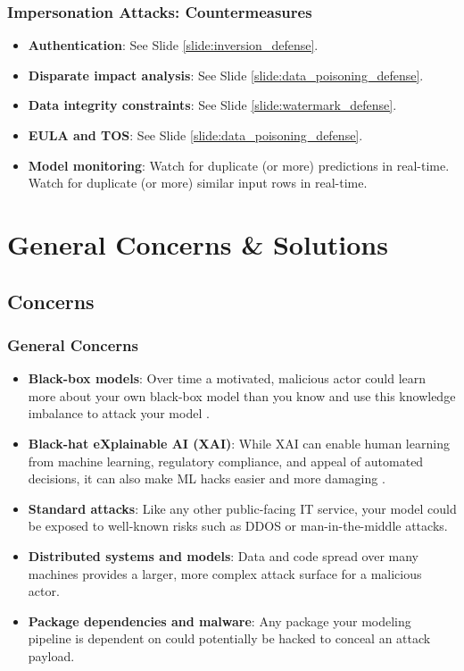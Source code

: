 \documentclass[11pt,
               aspectratio=169,
               hyperref={colorlinks}
               ]{beamer}
\begin{document}
			\begin{frame}
		
				\frametitle{Impersonation Attacks: \textbf{Countermeasures}}		
			
				\begin{itemize}
					\Large
					\item \textbf{Authentication}: See Slide \ref{slide:inversion_defense}. 
					\item \textbf{Disparate impact analysis}: See Slide \ref{slide:data_poisoning_defense}.
					\item \textbf{Data integrity constraints}: See Slide \ref{slide:watermark_defense}.
					\item \textbf{EULA and TOS}: See Slide \ref{slide:data_poisoning_defense}.
					\item \textbf{Model monitoring}: Watch for duplicate (or more) predictions in real-time. Watch for duplicate (or more) similar input rows in real-time.
				\end{itemize}
				
			\end{frame}

	\section{General Concerns \& Solutions}

		\subsection{Concerns}
			\begin{frame}[t, allowframebreaks]	
		
				\frametitle{General Concerns}	
				\footnotesize
				\begin{itemize}
					\item \textbf{Black-box models}: Over time a motivated, malicious actor could learn more about your own black-box model than you know and use this knowledge imbalance to attack your model \cite{papernot2018marauder}.
					\item \textbf{Black-hat eXplainable AI (XAI)}:  While XAI can enable human learning from machine learning, regulatory compliance, and appeal of automated decisions, it can also make ML hacks easier and more damaging \cite{shokri2019privacy}.
					\item \textbf{Standard attacks}: Like any other public-facing IT service, your model could be exposed to well-known risks such as DDOS or man-in-the-middle attacks.  
					\item \textbf{Distributed systems and models}: Data and code spread over many machines provides a larger, more complex attack surface for a malicious actor.
					\item \textbf{Package dependencies and malware}: Any package your modeling pipeline is dependent on could potentially be hacked to conceal an attack payload.
				\end{itemize}
				\normalsize

			\end{frame}
\end{document}
